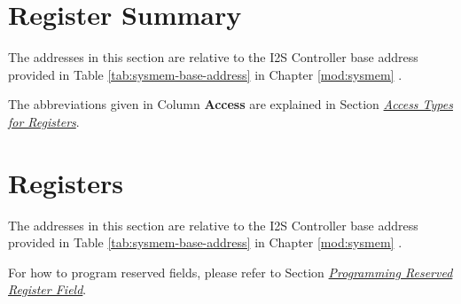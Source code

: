 \documentclass[main\_\_EN.tex]{subfiles}
\begin{document}



\clearpage
\hypertarget{i2s-reg-summ}{}
\section{Register Summary}
\label{sec:i2s-reg-summ}

The addresses in this section are relative to the I2S Controller base address provided in Table \ref{tab:sysmem-base-address} in Chapter \ref{mod:sysmem} \textit{}.

The abbreviations given in Column \textbf{Access} are explained in Section \hyperref[glossary-access-types]{\textit{Access Types for Registers}}.






\clearpage
\section{Registers}

The addresses in this section are relative to the I2S Controller base address provided in Table \ref{tab:sysmem-base-address} in Chapter \ref{mod:sysmem} \textit{}.

For how to program reserved fields, please refer to Section \hyperref[programming-reserved-field]{\textit{Programming Reserved Register Field}}.


\end{document}
